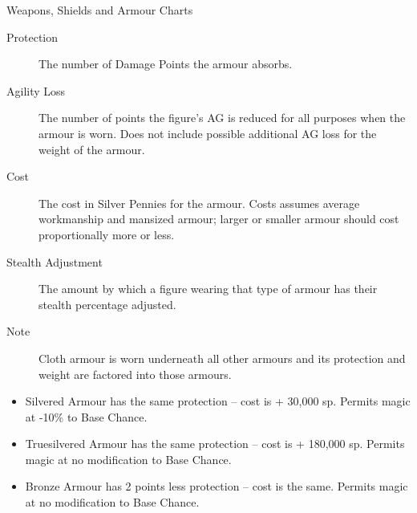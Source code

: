 \begin{Tables}{Weapons, Shields and Armour Charts}
\begin{multicols}{2}
\begin{description}
\item[Protection] The number of Damage Points the armour absorbs.

\item[Agility Loss] The number of points the figure’s AG is reduced
  for all purposes when the armour is worn. Does not include possible
  additional AG loss for the weight of the armour.

\item[Cost] The cost in Silver Pennies for the armour.  Costs assumes
  average workmanship and mansized armour; larger or smaller armour
  should cost proportionally more or less.

\item[Stealth Adjustment] The amount by which a figure wearing that
  type of armour has their stealth percentage adjusted.

\item[Note] Cloth armour is worn underneath all other armours and its
  protection and weight are factored into those armours.
\end{description}

\begin{itemize}
\item  Silvered Armour has the same protection – cost is + 30,000 sp.
Permits magic at -10\% to Base Chance.

\item Truesilvered Armour has the same protection – cost is + 180,000
  sp. Permits magic at no modification to Base Chance.

\item Bronze Armour has 2 points less protection – cost is the same.
Permits magic at no modification to Base Chance.
\end{itemize}
\end{multicols}
\end{Tables}
